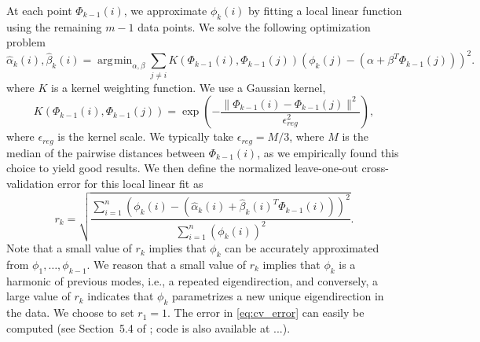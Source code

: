 \documentclass[3p]{elsarticle}
\DeclareMathOperator*{\argmin}{\arg\!\min}
\begin{document}
At each point $\Phi_{k-1}(i)$, we approximate $\phi_k(i)$ by fitting a local linear function using the remaining $m-1$ data points.
%
We solve the following optimization problem
\begin{equation} \label{eq:opt_problem}
\hat{\alpha}_k (i) , \hat{\beta}_k(i)  = \argmin_{\alpha, \beta} \sum_{j \ne i} K(\Phi_{k-1}(i), \Phi_{k-1}(j)) \left( \phi_{k}(j) - (\alpha + \beta^T \Phi_{k-1}(j)) \right)^2.
\end{equation}
%
where $K$ is a kernel weighting function.
%
We use a Gaussian kernel,
%
\begin{equation}
K(\Phi_{k-1}(i), \Phi_{k-1}(j))  = \exp \left( - \frac{\|\Phi_{k-1}(i) - \Phi_{k-1} (j) \|^2}{\epsilon_{reg}^2} \right),
\end{equation}
%
where $\epsilon_{reg}$ is the kernel scale.
%
We typically take $\epsilon_{reg} = M / 3$, where $M$ is the median of the pairwise distances between $\Phi_{k-1}(i)$,
as we empirically found this choice to yield good results.
%
We then define the normalized leave-one-out cross-validation error for this local linear fit as
\begin{equation} \label{eq:cv_error}
r_{k} = \sqrt{ \frac{\sum_{i=1}^n \left( \phi_{k} (i) - (\hat{\alpha}_k(i) + \hat{\beta}_k(i)^T \Phi_{k-1}(i))  \right)^2} {\sum_{i=1}^n  \left( \phi_{k} (i) \right)^2 }}.
\end{equation}
%
Note that a small value of $r_k$ implies that $\phi_{k}$ can be accurately approximated from $\phi_1, \dots, \phi_{k-1}$.
%
We reason that a small value of $r_k$ implies that $\phi_k$ is a harmonic of previous modes, i.e.,
a repeated eigendirection, and conversely, a large value of $r_{k}$ indicates that $\phi_{k}$
parametrizes a new unique eigendirection in the data.
%
We choose to set $r_1 = 1$.
%
The error in \eqref{eq:cv_error} can easily be computed (see Section~5.4 of \cite{wasserman2006all}; code is also available at ...).
\end{document}
